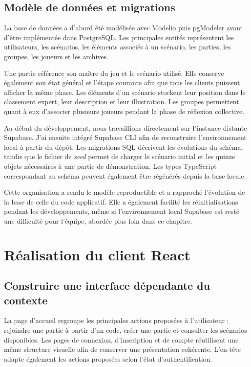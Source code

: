 \subsection{Modèle de données et migrations}

La base de données a d'abord été modélisée avec Modelio puis pgModeler avant d'être implémentée dans PostgreSQL. Les principales entités représentent les utilisateurs, les scénarios, les éléments associés à un scénario, les parties, les groupes, les joueurs et les archives.

Une partie référence son maître du jeu et le scénario utilisé. Elle conserve également son état général et l'étape courante afin que tous les clients puissent afficher la même phase. Les éléments d'un scénario stockent leur position dans le classement expert, leur description et leur illustration. Les groupes permettent quant à eux d'associer plusieurs joueurs pendant la phase de réflexion collective.

Au début du développement, nous travaillions directement sur l'instance distante Supabase. J'ai ensuite intégré Supabase CLI afin de reconstruire l'environnement local à partir du dépôt. Les migrations SQL décrivent les évolutions du schéma, tandis que le fichier de \textit{seed} permet de charger le scénario initial et les quinze objets nécessaires à une partie de démonstration. Les types TypeScript correspondant au schéma peuvent également être régénérés depuis la base locale.

Cette organisation a rendu le modèle reproductible et a rapproché l'évolution de la base de celle du code applicatif. Elle a également facilité les réinitialisations pendant les développements, même si l'environnement local Supabase est resté une difficulté pour l'équipe, abordée plus loin dans ce chapitre.

\section{Réalisation du client React}

\subsection{Construire une interface dépendante du contexte}

La page d'accueil regroupe les principales actions proposées à l'utilisateur : rejoindre une partie à partir d'un code, créer une partie et consulter les scénarios disponibles. Les pages de connexion, d'inscription et de compte réutilisent une même structure visuelle afin de conserver une présentation cohérente. L'en-tête adapte également les actions proposées selon l'état d'authentification.


